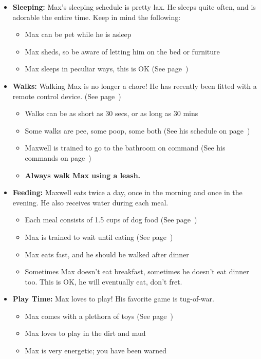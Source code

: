 \documentclass[pdftex,12pt]{article}
\begin{document}
\begin{itemize}\label{itm:schedule}
    \item \textbf{Sleeping:} Max's sleeping schedule is pretty lax. He sleeps
        quite often, and is adorable the entire time. Keep in mind the following:
        \begin{itemize}
            \item Max can be pet while he is asleep
            \item Max sheds, so be aware of letting him on the bed or furniture
            \item Max sleeps in peculiar ways, this is OK
                (See page~\pageref{fig:sleeping})
        \end{itemize}
    \item \textbf{Walks:} Walking Max is no longer a chore! He has recently been fitted
        with a remote control device. (See page~\pageref{sec:collar})
        \begin{itemize}
            \item Walks can be as short as 30 secs, or as long as 30 mins
            \item Some walks are pee, some poop, some both
                (See his schedule on page~\pageref{tab:schedule})
            \item Maxwell is trained to go to the bathroom on command
                (See his commands on page~\pageref{tab:commands})
            \item \textbf{Always walk Max using a leash.}
        \end{itemize}
    \item \textbf{Feeding:} Maxwell eats twice a day, once in the morning and
        once in the evening. He also receives water during each meal.
        \begin{itemize}
            \item Each meal consists of 1.5 cups of dog food
                (See page~\pageref{fig:food_bowl_filled})
            \item Max is trained to wait until eating
                (See page~\pageref{fig:food_container_open})
            \item Max eats fast, and he should be walked after dinner
            \item Sometimes Max doesn't eat breakfast, sometimes he doesn't eat dinner too.
                This is OK, he will eventually eat, don't fret.
        \end{itemize}
    \item \textbf{Play Time:} Max loves to play! His favorite game is tug-of-war.
        \begin{itemize}
            \item Max comes with a plethora of toys
                (See page~\pageref{itm:included_items})
            \item Max loves to play in the dirt and mud
            \item Max is very energetic; you have been warned
        \end{itemize}
\end{itemize}
\end{document}
